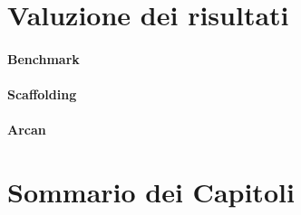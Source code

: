 \section{Valuzione dei risultati}

\paragraph{Benchmark}

\paragraph{Scaffolding}

\paragraph{Arcan}

\section{Sommario dei Capitoli}
